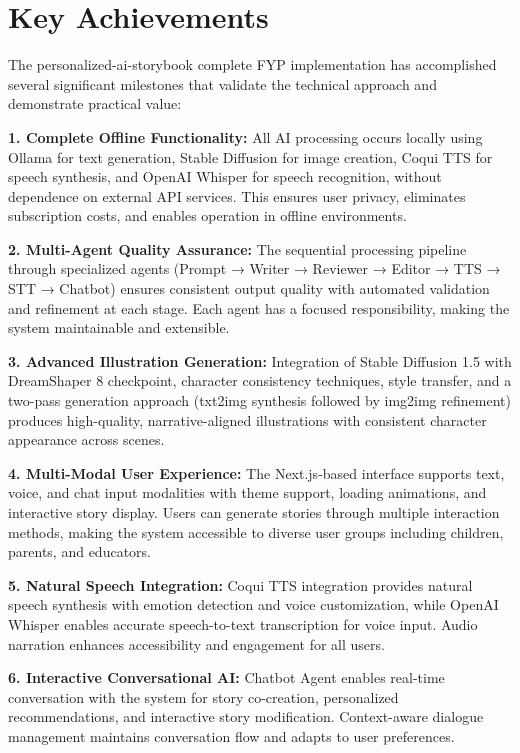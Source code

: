 \section{Key Achievements}
The personalized-ai-storybook complete FYP implementation has accomplished several significant milestones that validate the technical approach and demonstrate practical value:

\textbf{1. Complete Offline Functionality:} All AI processing occurs locally using Ollama for text generation, Stable Diffusion for image creation, Coqui TTS for speech synthesis, and OpenAI Whisper for speech recognition, without dependence on external API services. This ensures user privacy, eliminates subscription costs, and enables operation in offline environments.

\textbf{2. Multi-Agent Quality Assurance:} The sequential processing pipeline through specialized agents (Prompt → Writer → Reviewer → Editor → TTS → STT → Chatbot) ensures consistent output quality with automated validation and refinement at each stage. Each agent has a focused responsibility, making the system maintainable and extensible.

\textbf{3. Advanced Illustration Generation:} Integration of Stable Diffusion 1.5 with DreamShaper 8 checkpoint, character consistency techniques, style transfer, and a two-pass generation approach (txt2img synthesis followed by img2img refinement) produces high-quality, narrative-aligned illustrations with consistent character appearance across scenes.

\textbf{4. Multi-Modal User Experience:} The Next.js-based interface supports text, voice, and chat input modalities with theme support, loading animations, and interactive story display. Users can generate stories through multiple interaction methods, making the system accessible to diverse user groups including children, parents, and educators.

\textbf{5. Natural Speech Integration:} Coqui TTS integration provides natural speech synthesis with emotion detection and voice customization, while OpenAI Whisper enables accurate speech-to-text transcription for voice input. Audio narration enhances accessibility and engagement for all users.

\textbf{6. Interactive Conversational AI:} Chatbot Agent enables real-time conversation with the system for story co-creation, personalized recommendations, and interactive story modification. Context-aware dialogue management maintains conversation flow and adapts to user preferences.


